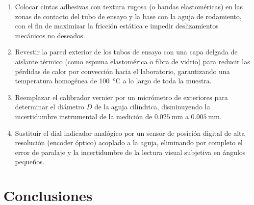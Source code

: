 \begin{enumerate}
    \item Colocar cintas adhesivas con textura rugosa (o bandas elastoméricas) en las zonas de contacto del tubo de ensayo y la base con la aguja de rodamiento, con el fin de maximizar la fricción estática e impedir deslizamientos mecánicos no deseados.
    \item Revestir la pared exterior de los tubos de ensayo con una capa delgada de aislante térmico (como espuma elastomérica o fibra de vidrio) para reducir las pérdidas de calor por convección hacia el laboratorio, garantizando una temperatura homogénea de \qty{100}{\celsius} a lo largo de toda la muestra.
    \item Reemplazar el calibrador vernier por un micrómetro de exteriores para determinar el diámetro $D$ de la aguja cilíndrica, disminuyendo la incertidumbre instrumental de la medición de $\qty{0,025}{\milli\meter}$ a $\qty{0,005}{\milli\meter}$.
    \item Sustituir el dial indicador analógico por un sensor de posición digital de alta resolución (encoder óptico) acoplado a la aguja, eliminando por completo el error de paralaje y la incertidumbre de la lectura visual subjetiva en ángulos pequeños.
\end{enumerate}

\section{Conclusiones}
\label{sec:conclusiones}

